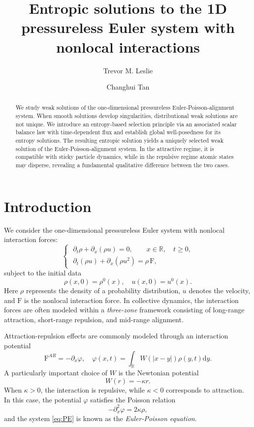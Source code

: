 \documentclass[11pt,reqno]{amsart}
\title[Entropic solutions to the Euler-Poisson-alignment system]{Entropic solutions to the 1D pressureless Euler system with nonlocal interactions}
\author[Trevor M. Leslie]{Trevor M. Leslie}
\author[Changhui Tan]{Changhui Tan}
\theoremstyle{definition}
\theoremstyle{remark}
\def\R{\mathbb{R}}
\def\dd{\mathrm{d}}
\def\pa{\partial}
\def\F{\mathrm{F}}
\begin{document}
	\allowdisplaybreaks
	
	\begin{abstract}
		We study weak solutions of the one-dimensional pressureless Euler-Poisson-alignment system. When smooth solutions develop singularities, distributional weak solutions are not unique. We introduce an entropy-based selection principle via an associated scalar balance law with time-dependent flux and establish global well-posedness for its entropy solutions. The resulting entropic solution yields a uniquely selected weak solution of the Euler-Poisson-alignment system. In the attractive regime, it is compatible with sticky particle dynamics, while in the repulsive regime atomic states may disperse, revealing a fundamental qualitative difference between the two cases.
	\end{abstract}
	
	\maketitle 
	
	\section{Introduction}
	
	We consider the one-dimensional pressureless Euler system with nonlocal interaction forces:
	\begin{equation}\label{eq:PE}
		\begin{cases}
			\,\,\pa_t \rho +\pa_x(\rho u)=0, \qquad x\in\R, \quad t\geq0,\\
			\,\,\pa_t (\rho u) +\pa_x (\rho u^2) = \rho\, \F,
		\end{cases}
	\end{equation}
	subject to the initial data
	\[ \rho(x,0) = \rho^0(x), \quad u(x,0) = u^0(x).\]
	Here $\rho$ represents the density of a probability distribution, $u$ denotes the velocity, and $\F$ is the nonlocal interaction force. In collective dynamics, the interaction forces are often modeled within a \emph{three-zone} framework consisting of long-range attraction, short-range repulsion, and mid-range alignment.
	
	Attraction-repulsion effects are commonly modeled through an interaction potential
	\[
	\F^{AR} =-\pa_x\varphi,\quad \varphi(x,t) = \int_\R W(|x-y|)\rho(y,t)\dd y.
	\]
	A particularly important choice of $W$ is the Newtonian potential
	\[
	W(r) = -\kappa r.
	\]
	When $\kappa>0$, the interaction is repulsive, while $\kappa<0$ corresponds to attraction. In this case, the potential $\varphi$ satisfies the Poisson relation
	\[
	-\pa_x^2\varphi = 2\kappa \rho,
	\]
	and the system \eqref{eq:PE} is known as the \emph{Euler-Poisson equation}.
	
\end{document}
